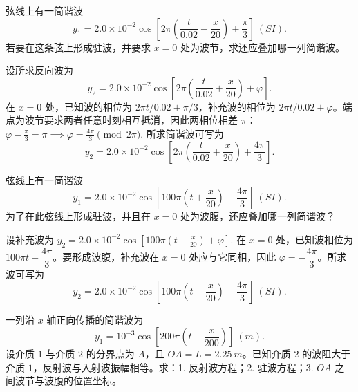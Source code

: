 \documentclass[lang=cn,11pt]{elegantbook}
\begin{document}
\begin{exercise}[已知一列行波时怎样补出形成驻波的反向波]
弦线上有一简谐波
\[
y_1=2.0\times10^{-2}\cos\!\left[2\pi\left(\frac{t}{0.02}-\frac{x}{20}\right)+\frac{\pi}{3}\right]\ (\si{SI}).
\]
若要在这条弦上形成驻波，并要求 \(x=0\) 处为波节，求还应叠加哪一列简谐波。
\end{exercise}

\begin{solution}
设所求反向波为
\[
y_2=2.0\times10^{-2}\cos\!\left[2\pi\left(\frac{t}{0.02}+\frac{x}{20}\right)+\varphi\right].
\]
在 \(x=0\) 处，已知波的相位为 \(2\pi t/0.02+\pi/3\)，补充波的相位为 \(2\pi t/0.02+\varphi\)。端点为波节要求两者任意时刻相互抵消，因此两相位相差 \(\pi\)：
 \(\varphi-\frac{\pi}{3}=\pi \implies \varphi=\frac{4\pi}{3}\pmod{2\pi}.\) 
所求简谐波可写为
\[
y_2=2.0\times10^{-2}\cos\!\left[2\pi\left(\frac{t}{0.02}+\frac{x}{20}\right)+\frac{4\pi}{3}\right].
\]
\end{solution}

\begin{exercise}[2005级期末：补出使 \(x=0\) 为波腹的反向波]
弦线上有一简谐波
\[
y_1=2.0\times10^{-2}\cos\!\left[100\pi\left(t+\frac{x}{20}\right)-\frac{4\pi}{3}\right]\ (\si{SI}).
\]
为了在此弦线上形成驻波，并且在 \(x=0\) 处为波腹，还应叠加哪一列简谐波？
\end{exercise}

\begin{solution}
设补充波为
 \(y_2=2.0\times10^{-2}\cos\!\left[100\pi\left(t-\frac{x}{20}\right)+\varphi\right].\) 
在 \(x=0\) 处，已知波相位为 \(100\pi t-\dfrac{4\pi}{3}\)。要形成波腹，补充波在 \(x=0\) 处应与它同相，因此 \(\varphi=-\dfrac{4\pi}{3}\)。所求波可写为
\[
y_2=2.0\times10^{-2}\cos\!\left[100\pi\left(t-\frac{x}{20}\right)-\frac{4\pi}{3}\right]\ (\si{SI}).
\]
\end{solution}

\begin{exercise}[波阻更大时反射波为什么要先带一个 \(\pi\)]
一列沿 \(x\) 轴正向传播的简谐波为
\[
y_1=10^{-3}\cos\!\left[200\pi\left(t-\frac{x}{200}\right)\right]\ (\si{m}).
\]
设介质 \(1\) 与介质 \(2\) 的分界点为 \(A\)，且 \(OA=L=\SI{2.25}{m}\)。已知介质 \(2\) 的波阻大于介质 \(1\)，反射波与入射波振幅相等。求：1. 反射波方程；2. 驻波方程；3. \(OA\) 之间波节与波腹的位置坐标。
\end{exercise}
\end{document}
